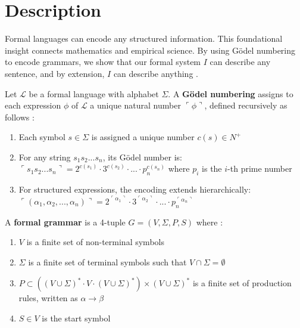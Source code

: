 \documentclass[runningheads]{llncs}
\begin{document}
	
	\section{Description}
	
	Formal languages can encode any structured information. This foundational insight connects mathematics and empirical science. By using Gödel numbering to encode grammars, we show that our formal system $I$ can describe any sentence, and by extension, $I$ can describe anything \cite{Godel1931}.
	
	\begin{definition}
		Let $\mathcal{L}$ be a formal language with alphabet $\Sigma$. A \textbf{Gödel numbering} assigns to each expression $\phi$ of $\mathcal{L}$ a unique natural number $\ulcorner\phi\urcorner$, defined recursively as follows \cite{Enderton2001}:
		\begin{enumerate}
			\item Each symbol $s \in \Sigma$ is assigned a unique number $c(s) \in N^+$
			\item For any string $s_1 s_2 ... s_n$, its Gödel number is:
			$\ulcorner s_1 s_2 ... s_n \urcorner = 2^{c(s_1)} \cdot 3^{c(s_2)} \cdot ... \cdot p_n^{c(s_n)}$
			where $p_i$ is the $i$-th prime number
			\item For structured expressions, the encoding extends hierarchically:
			$\ulcorner (\alpha_1, \alpha_2, ..., \alpha_n) \urcorner = 2^{\ulcorner \alpha_1 \urcorner} \cdot 3^{\ulcorner \alpha_2 \urcorner} \cdot ... \cdot p_n^{\ulcorner \alpha_n \urcorner}$
		\end{enumerate}
	\end{definition}
	
	\medskip
	
	\begin{definition}
		A \textbf{formal grammar} is a 4-tuple $G = (V, \Sigma, P, S)$ where \cite{Enderton2001}:
		\begin{enumerate}
			\item $V$ is a finite set of non-terminal symbols
			\item $\Sigma$ is a finite set of terminal symbols such that $V \cap \Sigma = \emptyset$
			\item $P \subset ((V \cup \Sigma)^* \cdot V \cdot (V \cup \Sigma)^*) \times (V \cup \Sigma)^*$ is a finite set of production rules, written as $\alpha \rightarrow \beta$
			\item $S \in V$ is the start symbol
		\end{enumerate}
	\end{definition}
	
\end{document}
